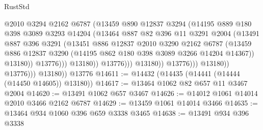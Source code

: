 \begin{lexlean}{RustStd}
\begin{coremodule}
                                      @2010
                                      @3294
                                      @2162
                                      @6787
                                      (@13459
                                        @890
                                        @12837
                                        @3294
                                        (@14195
                                          @889
                                          @180
                                          @398
                                          @3089
                                          @3293
                                          @14204
                                          (@13464
                                            @887
                                            @82
                                            @396
                                            @11
                                            @3291
                                            @2004
                                            (@13491
                                              @887
                                              @396
                                              @3291
                                              (@13451
                                                @886
                                                @12837
                                                @2010
                                                @3290
                                                @2162
                                                @6787
                                                (@13459
                                                  @886
                                                  @12837
                                                  @3290
                                                  (@14195 @862 @180 @398 @3089 @3266 @14204 @14367))
                                                @13180))
                                            @13776)))
                                      @13180))
                                  @13776)))
                            @13180))
                        @13776)))
                  @13180))
              @13776)))
        @13180))
    @13776
@14611 := @14432 (@14435 (@14441 (@14444 (@14450 @14605)) @13180))
@14617 := @13464 @1062 @82 @657 @11 @3467 @2004
@14620 := @13491 @1062 @657 @3467
@14626 := @14012 @1061 @14014 @2010 @3466 @2162 @6787
@14629 := @13459 @1061 @14014 @3466
@14635 := @13464 @934 @1060 @396 @659 @3338 @3465
@14638 := @13491 @934 @396 @3338

\end{coremodule}
\end{lexlean}
